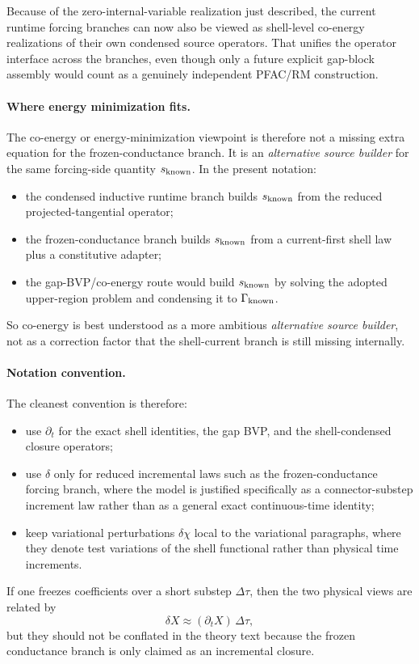 \documentclass[11pt,a4paper]{article}
\begin{document}
Because of the zero-internal-variable realization just described, the current
runtime forcing branches can now also be viewed as shell-level co-energy
realizations of their own condensed source operators. That unifies the
operator interface across the branches, even though only a future explicit
gap-block assembly would count as a genuinely independent PFAC/RM
construction.

\paragraph{Where energy minimization fits.}
The co-energy or energy-minimization viewpoint is therefore not a missing extra
equation for the frozen-conductance branch. It is an \emph{alternative source
builder} for the same forcing-side quantity \(s_{\rm known}\). In the present
notation:
\begin{itemize}
\item the condensed inductive runtime branch builds \(s_{\rm known}\) from the
reduced projected-tangential operator;
\item the frozen-conductance branch builds \(s_{\rm known}\) from a
current-first shell law plus a constitutive adapter;
\item the gap-BVP/co-energy route would build \(s_{\rm known}\) by solving the
adopted upper-region problem and condensing it to \(\Gamma_{\rm known}\).
\end{itemize}
So co-energy is best understood as a more ambitious \emph{alternative source
builder}, not as a correction factor that the shell-current branch is still
missing internally.

\paragraph{Notation convention.}
The cleanest convention is therefore:
\begin{itemize}
\item use \(\partial_t\) for the exact shell identities, the gap BVP, and the
shell-condensed closure operators;
\item use \(\delta\) only for reduced incremental laws such as the
frozen-conductance forcing branch, where the model is justified specifically as
a connector-substep increment law rather than as a general exact
continuous-time identity;
\item keep variational perturbations \(\delta\chi\) local to the variational
paragraphs, where they denote test variations of the shell functional rather
than physical time increments.
\end{itemize}
If one freezes coefficients over a short substep \(\Delta\tau\), then the two
physical views are related by
\[
\delta X \approx (\partial_t X)\,\Delta\tau,
\]
but they should not be conflated in the theory text because the frozen
conductance branch is only claimed as an incremental closure.
\end{document}
